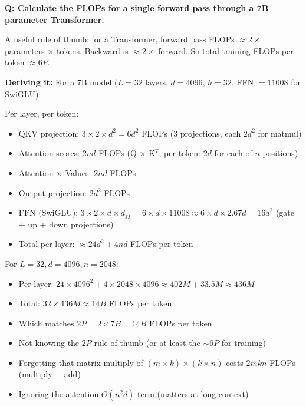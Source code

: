 \begin{interviewq}
\end{interviewq}

\begin{interviewq}
\textbf{Q: Calculate the FLOPs for a single forward pass through a 7B parameter Transformer.}

 \quad {} \quad \badgefreq{\freqhigh}

\stronganswer A useful rule of thumb: for a Transformer, forward pass FLOPs $\approx 2 \times$ parameters $\times$ tokens. Backward is $\approx 2\times$ forward. So total training FLOPs per token $\approx 6P$.

\textbf{Deriving it:} For a 7B model ($L=32$ layers, $d=4096$, $h=32$, FFN $=11008$ for SwiGLU):

Per layer, per token:
\begin{itemize}
    \item QKV projection: $3 \times 2 \times d^2 = 6d^2$ FLOPs (3 projections, each $2d^2$ for matmul)
    \item Attention scores: $2nd$ FLOPs (Q $\times$ K$^T$, per token: $2d$ for each of $n$ positions)
    \item Attention $\times$ Values: $2nd$ FLOPs
    \item Output projection: $2d^2$ FLOPs
    \item FFN (SwiGLU): $3 \times 2 \times d \times d_{ff} = 6 \times d \times 11008 \approx 6 \times d \times 2.67d = 16d^2$ (gate + up + down projections)
    \item Total per layer: $\approx 24d^2 + 4nd$ FLOPs per token
\end{itemize}

For $L=32, d=4096, n=2048$:
\begin{itemize}
    \item Per layer: $24 \times 4096^2 + 4 \times 2048 \times 4096 \approx 402M + 33.5M \approx 436M$
    \item Total: $32 \times 436M \approx 14B$ FLOPs per token
    \item Which matches $2P = 2 \times 7B = 14B$ FLOPs per token
\end{itemize}

\redflags
\begin{itemize}
    \item Not knowing the $2P$ rule of thumb (or at least the $\sim 6P$ for training)
    \item Forgetting that matrix multiply of $(m \times k) \times (k \times n)$ costs $2mkn$ FLOPs (multiply + add)
    \item Ignoring the attention $O(n^2 d)$ term (matters at long context)
\end{itemize}


\end{interviewq}

